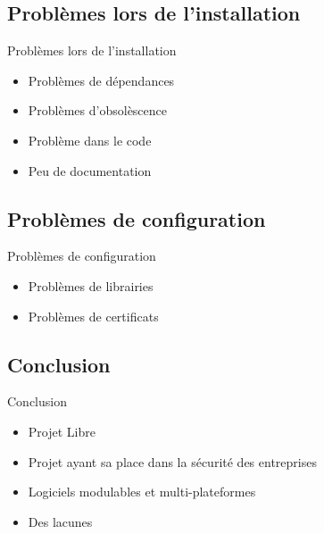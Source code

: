 \documentclass[t,12pt]{beamer}
\begin{document}
	\subsection{Problèmes lors de l'installation}
		\begin{frame}                                                         %
    \begin{center}{\textcolor{grisbleu}{\Large Problèmes lors de l'installation}}\end{center} %
		\begin{itemize}
			\item Problèmes de dépendances
			\newline
			\item Problèmes d'obsolèscence
			\newline		
			\item Problème dans le code
			\newline
			\item Peu de documentation
		\end{itemize}
		\end{frame}

	\subsection{Problèmes de configuration}
		\begin{frame}                                                         %
    \begin{center}{\textcolor{grisbleu}{\Large Problèmes de configuration}}\end{center} %
		\begin{itemize}
			\item Problèmes de librairies
			\newline
			\newline
			\item Problèmes de certificats
		\end{itemize}
		\end{frame}


	\subsection{Conclusion}
		\begin{frame}                                                         %
    \begin{center}{\textcolor{grisbleu}{\Large Conclusion}}\end{center} %
		\begin{itemize}
			\item Projet Libre
			\newline
			\item Projet ayant sa place dans la sécurité des entreprises
			\newline
			\item Logiciels modulables et multi-plateformes
			\newline
			\item Des lacunes 
		\end{itemize}
		\end{frame}
\end{document}
